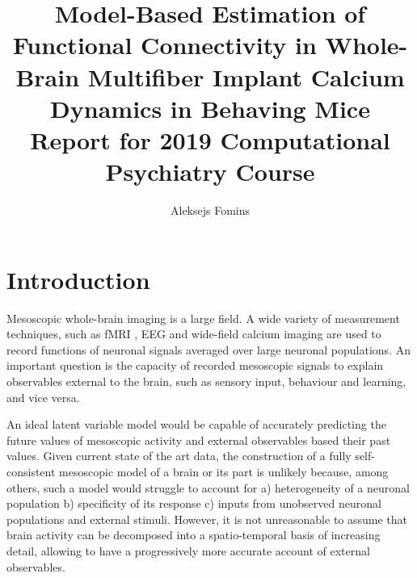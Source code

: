 \documentclass[a4paper,10pt]{article}
\title{
  Model-Based Estimation of Functional Connectivity in Whole-Brain Multifiber Implant Calcium Dynamics in Behaving Mice\\
  \vspace{10pt}
  \small Report for 2019 Computational Psychiatry Course}
\author{Aleksejs Fomins}
\begin{document}
\maketitle

\section{Introduction}
Mesoscopic whole-brain imaging is a large field. A wide variety of measurement techniques, such as fMRI \cite{ogawa_brain_1990, belliveau_functional_1990, deyoe_functional_1994, buxton_modeling_2004, kiebel_dynamic_2008}, EEG \cite{wright_dynamics_1996, baillet_bayesian_1997, gross_dynamic_2001, kececi_quantitative_2008} and wide-field calcium imaging \cite{gilad_behavioral_2018, silasi_intact_2016, holtmaat_long_term_2009, dombeck_imaging_2007} are used to record functions of neuronal signals averaged over large neuronal populations. An important question is the capacity of recorded mesoscopic signals to explain observables external to the brain, such as sensory input, behaviour and learning, and vice versa.

An ideal latent variable model would be capable of accurately predicting the future values of mesoscopic activity and external observables based their past values. Given current state of the art data, the construction of a fully self-consistent mesoscopic model of a brain or its part is unlikely because, among others, such a model would struggle to account for a) heterogeneity of a neuronal population b) specificity of its response c) inputs from unobserved neuronal populations and external stimuli. However, it is not unreasonable to assume that brain activity can be decomposed into a spatio-temporal basis of increasing detail, allowing to have a progressively more accurate account of external observables.
\end{document}

